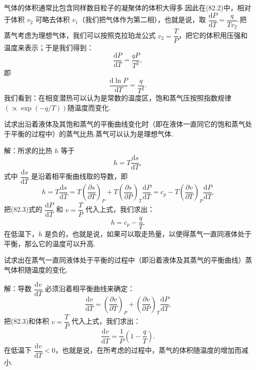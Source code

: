 气体的体积通常比包含同样数目粒子的凝聚体的体积大得多.因此在(82.2)中，相对于体积 $v_2$ 可略去体积 $v_1$（我们把气体作为第二相），也就是说，取 $\dfrac{\mathrm{d}P}{\mathrm{d}T}=\dfrac{q}{Tv_2}$.把蒸气考虑为理想气体，我们可以按照克拉珀龙公式 $v_2=\dfrac{T}{P}$，把它的体积用压强和温度来表示；于是我们得到：
\begin{equation*}
  \frac{\mathrm{d}P}{\mathrm{d}T}=\frac{qP}{T^2},
\end{equation*}
即
\begin{equation}
  \frac{\mathrm{d}\ln P}{\mathrm{d}T}=\frac{q}{T^2}.
\end{equation}
我们看到：在相变潜热可以认为是常数的温度区，饱和蒸气压按照指数规律$\left(\propto\exp(-q/T)\right)$随温度而变化.

\begin{xiti}

\quad 试求出沿着液体及其饱和蒸气的平衡曲线变化时（即在液体一直同它的饱和蒸气处于平衡的过程中）的蒸气比热.蒸气可以认为是理想气体.

解：所求的比热 $h$ 等于
\begin{equation*}
  h=T\frac{\mathrm{d}s}{\mathrm{d}T},
\end{equation*}
式中 $\dfrac{\mathrm{d}s}{\mathrm{d}T}$ 是沿着相平衡曲线取的导数，即
\begin{equation*}
  h=T\frac{\mathrm{d}s}{\mathrm{d}T}
  =T\left(\frac{\partial s}{\partial T}\right)_P
  +T\left(\frac{\partial s}{\partial P}\right)_T\frac{\mathrm{d}P}{\mathrm{d}T}
  =c_p-T\left(\frac{\partial v}{\partial T}\right)_P\frac{\mathrm{d}P}{\mathrm{d}T}.
\end{equation*}
把(82.3)式的 $\dfrac{\mathrm{d}P}{\mathrm{d}T}$ 和 $v=\dfrac{T}{P}$ 代入上式，我们求出：
\begin{equation*}
  h=c_p-\frac{q}{T}.
\end{equation*}
在低温下，$h$ 是负的，也就是说，如果可以取走热量，以使得蒸气一直同液体处于平衡，那么它的温度可以升高.

\quad 试求出在蒸气一直同液体处于平衡的过程中（即沿着液体及其蒸气的平衡曲线）蒸气体积随温度的变化.

解：导数 $\dfrac{\mathrm{d}v}{\mathrm{d}T}$ 必须沿着相平衡曲线来确定：
\begin{equation*}
  \frac{\mathrm{d}v}{\mathrm{d}T}
  =\left(\frac{\partial v}{\partial T}\right)_P
  +\left(\frac{\partial v}{\partial P}\right)_T\frac{\mathrm{d}P}{\mathrm{d}T}.
\end{equation*}
把(82.3)和体积 $v=\dfrac{T}{P}$ 代入上式，我们求出：
\begin{equation*}
  \frac{\mathrm{d}v}{\mathrm{d}T}=\frac{1}{P}\left(1-\frac{q}{T}\right).
\end{equation*}
在低温下 $\dfrac{\mathrm{d}v}{\mathrm{d}T}<0$，也就是说，在所考虑的过程中，蒸气的体积随温度的增加而减小.

\end{xiti}

